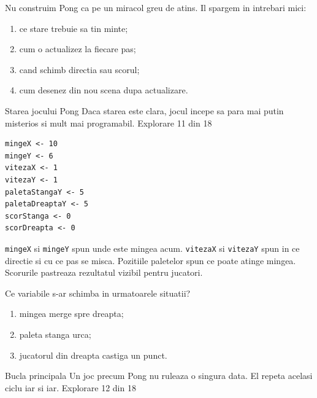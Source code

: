 \begin{conceptbox}
Nu construim Pong ca pe un miracol greu de atins. Il spargem in intrebari mici:
\begin{enumerate}
\item ce stare trebuie sa tin minte;
\item cum o actualizez la fiecare pas;
\item cand schimb directia sau scorul;
\item cum desenez din nou scena dupa actualizare.
\end{enumerate}
\end{conceptbox}

\clearpage

\PageHeader
  {Starea jocului Pong}
  {Daca starea este clara, jocul incepe sa para mai putin misterios si mult mai programabil.}
  {Explorare 11 din 18}

\begin{examplebox}
\begin{lstlisting}[style=codequest]
mingeX <- 10
mingeY <- 6
vitezaX <- 1
vitezaY <- 1
paletaStangaY <- 5
paletaDreaptaY <- 5
scorStanga <- 0
scorDreapta <- 0
\end{lstlisting}
\end{examplebox}

\begin{missionbox}
\texttt{mingeX} si \texttt{mingeY} spun unde este mingea acum. \texttt{vitezaX} si \texttt{vitezaY} spun in ce directie si cu ce pas se misca. Pozitiile paletelor spun ce poate atinge mingea. Scorurile pastreaza rezultatul vizibil pentru jucatori.
\end{missionbox}

\begin{guidebox}[Verificare]
Ce variabile s-ar schimba in urmatoarele situatii?
\begin{enumerate}
\item mingea merge spre dreapta;
\item paleta stanga urca;
\item jucatorul din dreapta castiga un punct.
\end{enumerate}
\end{guidebox}

\clearpage

\PageHeader
  {Bucla principala}
  {Un joc precum Pong nu ruleaza o singura data. El repeta acelasi ciclu iar si iar.}
  {Explorare 12 din 18}

